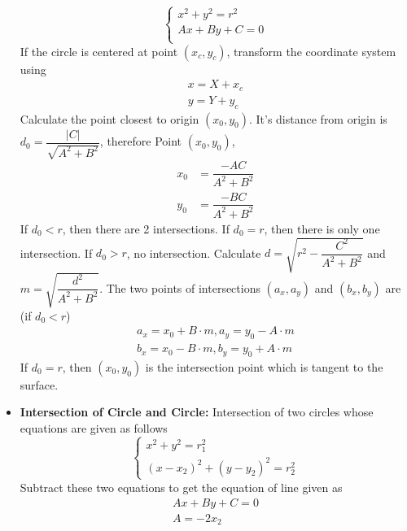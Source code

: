 \documentclass[15pt,a4paper]{article}
\begin{document}
\begin{landscape}
\begin{multicols*}{3}
\begin{itemize}
        \begin{equation*}
            \begin{cases}
                x^2 + y^2 = r^2 \\
                Ax + By + C = 0 \\
            \end{cases}
        \end{equation*}
        If the circle is centered at point $(x_c, y_c)$, transform the coordinate system using
        \begin{gather*}
            x = X + x_c\\
            y = Y + y_c
        \end{gather*}
    Calculate the point closest to origin $(x_0, y_0)$. It's distance from origin is $d_0 = \dfrac{|C|}{\sqrt{A^2 + B^2}}$, therefore Point $(x_0, y_0)$,
        \begin{align*}
            x_0 &= \dfrac{-AC}{A^2 + B^2}\\
            y_0 &= \dfrac{-BC}{A^2 + B^2}
        \end{align*}
    If $d_0 < r$, then there are 2 intersections. If $d_0 = r$, then there is only one intersection. If $d_0 > r$, no intersection. Calculate $d = \sqrt{r^2 - \dfrac{C^2}{A^2 + B^2}}$ and $m = \sqrt{\dfrac{d^2}{A^2 + B^2}}$. The two points of intersections $(a_x, a_y)$ and $(b_x, b_y)$ are (if $d_0 < r$)
        \begin{gather*}
            a_x = x_0 + B \cdot m, a_y = y_0 - A  \cdot m\\
            b_x = x_0 - B\cdot m, b_y = y_0 + A\cdot m
        \end{gather*}
    If $d_0 = r$, then $(x_0, y_0)$ is the intersection point which is tangent to the surface.
    \item \textbf{Intersection of Circle and Circle:} Intersection of two circles whose equations are given as follows
        \begin{equation*}
                \begin{cases*}
                    x^2 + y^2 = r_1^2\\
                    (x - x_2)^2 + (y - y_2)^2 = r_2^2
                \end{cases*}
        \end{equation*}
        Subtract these two equations to get the equation of line given as
        \begin{gather*}
            Ax + By + C = 0\\
            A = -2x_2\\

\end{gather*}
\end{itemize}
\end{multicols*}
\end{landscape}
\end{document}

